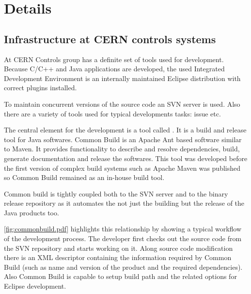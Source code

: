 \chapter{Details}


\section{Infrastructure at CERN controls systems}

At CERN Controls group has a definite set of tools used for development. Because
C/C++ and Java applications are developed, the used Integrated Development
Environment is an internally maintained Eclipse distribution with correct
plugins installed.

To maintain concurrent versions of the source code an SVN server is used. Also
there are a variety of tools used for typical developments tasks: issue
etc. 

The central element for the development is a tool called 
\cite{CommonBuild}. It is a build and release tool for Java softwares. Common
Build is an Apache Ant based software similar to Maven. It provides
functionality to describe and resolve dependencies, build, generate
documentation and release the softwares. This tool was developed before the
first version of complex build systems such as Apache Maven was published so 
Common Build remained as an in-house build tool. 

Common build is tightly coupled both to the SVN server and to the binary release
repository as it automates the not just the building but the release of the
Java products too.

\autoref{fig:commonbuild.pdf} highlights this relationship by showing a typical
workflow of the development process. The developer first checks out the source
code from the SVN repository and starts working on it. Along source code
modification there is an XML descriptor containing the information required by
Common Build (such as name and version of the product and the required
dependencies). Also Common Build is capable to setup build path and the related
options for Eclipse development. 

